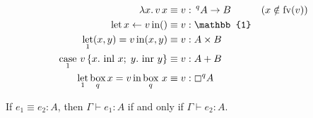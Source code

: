 \documentclass[acmsmall,screen,nonacm]{acmart}
\DeclareMathOperator{\llet}{\text{let}}
\DeclareMathOperator{\lin}{\text{in}}
\DeclareMathOperator{\case}{\text{case}}
\DeclareMathOperator{\bbox}{\text{box}}
\newcommand{\unit}{\mathbb{1}}
\DeclareMathOperator{\inl}{\text{inl}}
\DeclareMathOperator{\inr}{\text{inr}}
\newcommand{\tee}{\vdash}
\begin{document}
\begin{align*}
  \lambda x.\, v\, x &\equiv v : \,^q A \rightarrow B
    && (x \notin \mathrm{fv}(v)) \\
  \llet x \leftarrow v \lin () &\equiv v : \unit \\
  \llet_1 (x, y) = v \lin (x, y) &\equiv v : A \times B \\
  \case_1\, v\, \{x.\, \inl\, x;\; y.\, \inr\, y\} &\equiv v : A + B \\
  \llet_{1} \bbox_{q} x = v \lin \bbox_{q}\, x &\equiv v : \boxempty^{q} A
\end{align*}

\begin{lemma}
\label{lem:graded-modal-type-preservation-eta-laws}
  If\/ $e_1 \equiv e_2 : A$, then $\Gamma \tee e_1 : A$ if and only if $\Gamma \tee e_2 : A$.
\end{lemma}
\end{document}
